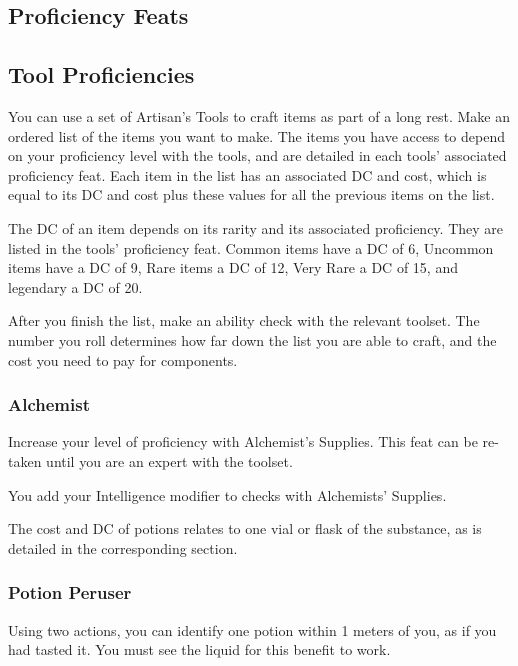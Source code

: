 \subsection*{Proficiency Feats}

\subsection*{Tool Proficiencies}
    You can use a set of Artisan's Tools to craft items as part of a long rest.
    Make an ordered list of the items you want to make.
    The items you have access to depend on your proficiency level with the tools, and are detailed in each tools' associated proficiency feat.
    Each item in the list has an associated DC and cost, which is equal to its DC and cost plus these values for all the previous items on the list.

    The DC of an item depends on its rarity and its associated proficiency.
    They are listed in the tools' proficiency feat.
    Common items have a DC of 6, Uncommon items have a DC of 9, Rare items a DC of 12, Very Rare a DC of 15, and legendary a DC of 20.

    After you finish the list, make an ability check with the relevant toolset.
    The number you roll determines how far down the list you are able to craft, and the cost you need to pay for components.

\subsubsection{Alchemist} \label{feat::alchemist}
    Increase your level of proficiency with Alchemist's Supplies.
    This feat can be re-taken until you are an expert with the toolset.

    You add your Intelligence modifier to checks with Alchemists' Supplies.

    The cost and DC of potions relates to one vial or flask of the substance, as is detailed in the corresponding section.
\subsubsection{Potion Peruser} \label{feat::potionperuser}
    Using two actions, you can identify one potion within 1 meters of you, as if you had tasted it.
    You must see the liquid for this benefit to work.
